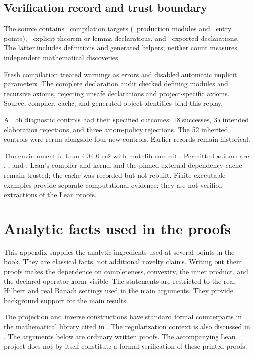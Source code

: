 \documentclass[11pt,oneside,openany]{book}
\newcommand{\chap}[1]{\section{#1}}
\numberwithin{equation}{section}
\begin{document}
\subsection{Verification record and trust boundary}
The source contains \KSEditionTargets\ compilation targets (\KSEditionProductionModules\ production modules and \KSEditionRoots\ entry points), \KSEditionTheorems\ explicit theorem or lemma declarations, and \KSEditionDeclarations\ exported declarations. The latter includes definitions and generated helpers; neither count measures independent mathematical discoveries.

Fresh compilation treated warnings as errors and disabled automatic implicit parameters. The complete declaration audit checked defining modules and recursive axioms, rejecting unsafe declarations and project-specific axioms. Source, compiler, cache, and generated-object identities bind this replay.

All 56 diagnostic controls had their specified outcomes: 18 successes, 35 intended elaboration rejections, and three axiom-policy rejections. The 52 inherited controls were rerun alongside four new controls. Earlier records remain historical.

The environment is Lean 4.34.0-rc2 with mathlib commit
.
Permitted axioms are , , and . Lean's compiler and kernel and the pinned external dependency cache remain trusted; the cache was recorded but not rebuilt. Finite executable examples provide separate computational evidence; they are not verified extractions of the Lean proofs.




\chap{Analytic facts used in the proofs}\label{KS:app:proof-tools}
This appendix supplies the analytic ingredients used at several points in the book. They are classical facts, not additional novelty claims. Writing out their proofs makes the dependence on completeness, convexity, the inner product, and the declared operator norm visible. The statements are restricted to the real Hilbert and real Banach settings used in the main arguments. They provide background support for the main results.

The projection and inverse constructions have standard formal counterparts in the mathematical library cited in \cite{KS:mathlib-projection,KS:mathlib-banach}. The regularization context is also discussed in \cite{KS:clason-inverse}. The arguments below are ordinary written proofs. The accompanying Lean project does not by itself constitute a formal verification of these printed proofs.
\end{document}

